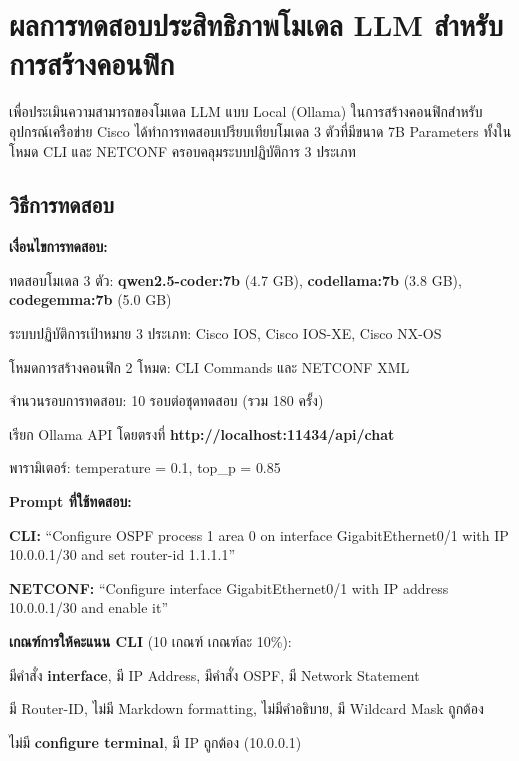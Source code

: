 \section{ผลการทดสอบประสิทธิภาพโมเดล LLM สำหรับการสร้างคอนฟิก}
\hspace*{1.3em}
เพื่อประเมินความสามารถของโมเดล LLM แบบ Local (Ollama) ในการสร้างคอนฟิกสำหรับอุปกรณ์เครือข่าย Cisco ได้ทำการทดสอบเปรียบเทียบโมเดล 3 ตัวที่มีขนาด 7B Parameters ทั้งในโหมด CLI และ NETCONF ครอบคลุมระบบปฏิบัติการ 3 ประเภท

\subsection{วิธีการทดสอบ}
\hspace*{1.3em}
\textbf{เงื่อนไขการทดสอบ:}
\begin{mycustomitem2}
    \item ทดสอบโมเดล 3 ตัว: \textbf{qwen2.5-coder:7b} (4.7 GB), \textbf{codellama:7b} (3.8 GB), \textbf{codegemma:7b} (5.0 GB)
    \item ระบบปฏิบัติการเป้าหมาย 3 ประเภท: Cisco IOS, Cisco IOS-XE, Cisco NX-OS
    \item โหมดการสร้างคอนฟิก 2 โหมด: CLI Commands และ NETCONF XML
    \item จำนวนรอบการทดสอบ: 10 รอบต่อชุดทดสอบ (รวม 180 ครั้ง)
    \item เรียก Ollama API โดยตรงที่ \textbf{http://localhost:11434/api/chat}
    \item พารามิเตอร์: temperature = 0.1, top\_p = 0.85
\end{mycustomitem2}

\hspace*{1.3em}
\textbf{Prompt ที่ใช้ทดสอบ:}
\begin{mycustomitem2}
    \item \textbf{CLI:} ``Configure OSPF process 1 area 0 on interface GigabitEthernet0/1 with IP 10.0.0.1/30 and set router-id 1.1.1.1''
    \item \textbf{NETCONF:} ``Configure interface GigabitEthernet0/1 with IP address 10.0.0.1/30 and enable it''
\end{mycustomitem2}

\hspace*{1.3em}
\textbf{เกณฑ์การให้คะแนน CLI} (10 เกณฑ์ เกณฑ์ละ 10\%):
\begin{mycustomitem2}
    \item มีคำสั่ง \textbf{interface}, มี IP Address, มีคำสั่ง OSPF, มี Network Statement
    \item มี Router-ID, ไม่มี Markdown formatting, ไม่มีคำอธิบาย, มี Wildcard Mask ถูกต้อง
    \item ไม่มี \textbf{configure terminal}, มี IP ถูกต้อง (10.0.0.1)
\end{mycustomitem2}

